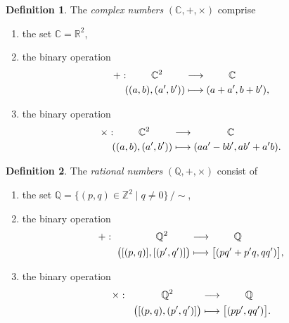\documentclass{article}
\theoremstyle{definition}
\newtheorem{definition}{Definition}
\newcommand{\C}{\mathbb{C}}
\newcommand{\R}{\mathbb{R}}
\newcommand{\Q}{\mathbb{Q}}
\newcommand{\Z}{\mathbb{Z}}
\begin{document}
\begin{definition}
	The \emph{complex numbers} $(\C,+,\times)$ comprise
	\begin{enumerate}
		\item the set $\C=\R^2$,
		\item the binary operation
			\begin{align*}
				+:	\hspace{.8cm}\C^2\hspace{.8cm}	&\longrightarrow	\hspace{.8cm}\C		\\
					((a,b),(a',b'))			&\longmapsto		(a+a',b+b'),
			\end{align*}
		\item the binary operation
			\begin{align*}
				\times:	\hspace{.8cm}\C^2\hspace{.8cm}	&\longrightarrow	\hspace{1.2cm}\C	\\
					((a,b),(a',b'))			&\longmapsto		(aa'-bb',ab'+a'b).
			\end{align*}
	\end{enumerate}
\end{definition}

\begin{definition}
	The \emph{rational numbers} $(\Q,+,\times)$ consist of
	\begin{enumerate}
		\item the set $\Q=\{(p,q) \in\Z^2 \mid q\neq 0\}\,/\!\sim$,
		\item the binary operation
			\begin{align*}
				+:	\hspace{1.5cm}\Q^2\hspace{.8cm}	&\longrightarrow	\hspace{.8cm}\Q		\\
					\big([(p,q)],[(p',q')]\big)	&\longmapsto		\big[(pq'+p'q,qq')\big],
			\end{align*}
		\item the binary operation
			\begin{align*}
				\times:	\hspace{1.2cm}\Q^2\hspace{1.0cm}	&\longrightarrow	\hspace{.8cm}\Q	\\
					\big([(p,q),(p',q')]\big)		&\longmapsto		\big[(pp',qq')\big].
			\end{align*}
	\end{enumerate}
\end{definition}
\end{document}
